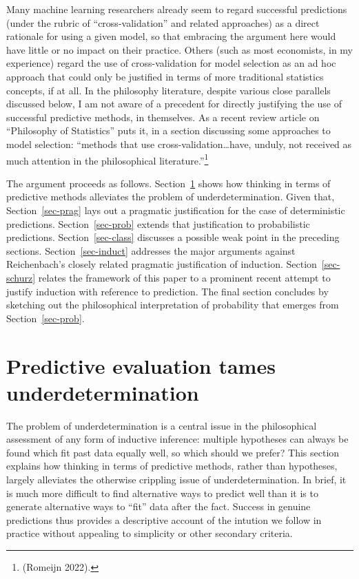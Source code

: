\documentclass[
  letterpaper,
  DIV=11,
  numbers=noendperiod]{scrartcl}
\theoremstyle{definition}
\theoremstyle{remark}
\begin{document}
Many machine learning researchers already seem to regard successful
predictions (under the rubric of ``cross-validation'' and related
approaches) as a direct rationale for using a given model, so that
embracing the argument here would have little or no impact on their
practice. Others (such as most economists, in my experience) regard the
use of cross-validation for model selection as an ad hoc approach that
could only be justified in terms of more traditional statistics
concepts, if at all. In the philosophy literature, despite various close
parallels discussed below, I am not aware of a precedent for directly
justifying the use of successful predictive methods, in themselves. As a
recent review article on ``Philosophy of Statistics'' puts it, in a
section discussing some approaches to model selection: ``methods that
use cross-validation\ldots have, unduly, not received as much attention
in the philosophical literature.''\footnote{(Romeijn 2022).}

The argument proceeds as follows. Section~\ref{sec-under} shows how
thinking in terms of predictive methods alleviates the problem of
underdetermination. Given that, Section~\ref{sec-prag} lays out a
pragmatic justification for the case of deterministic predictions.
Section~\ref{sec-prob} extends that justification to probabilistic
predictions. Section~\ref{sec-class} discusses a possible weak point in
the preceding sections. Section~\ref{sec-induct} addresses the major
arguments against Reichenbach's closely related pragmatic justification
of induction. Section~\ref{sec-schurz} relates the framework of this
paper to a prominent recent attempt to justify induction with reference
to prediction. The final section concludes by sketching out the
philosophical interpretation of probability that emerges from
Section~\ref{sec-prob}.

\section{Predictive evaluation tames
underdetermination}\label{sec-under}

The problem of underdetermination is a central issue in the
philosophical assessment of any form of inductive inference: multiple
hypotheses can always be found which fit past data equally well, so
which should we prefer? This section explains how thinking in terms of
predictive methods, rather than hypotheses, largely alleviates the
otherwise crippling issue of underdetermination. In brief, it is much
more difficult to find alternative ways to predict well than it is to
generate alternative ways to ``fit'' data after the fact. Success in
genuine predictions thus provides a descriptive account of the intution
we follow in practice without appealing to simplicity or other secondary
criteria.
\end{document}
